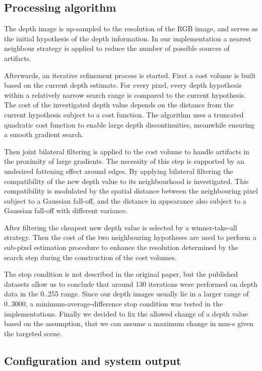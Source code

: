 \documentclass{ucl_thesis}
\begin{document}
\subsection{Processing algorithm}
\par The depth image is up-sampled to the resolution of the RGB image, and
serves as the initial hypothesis of the depth information. In our implementation a nearest neighbour strategy is applied to reduce the number of possible sources of artifacts. 
\par Afterwards, an iterative refinement process is started. First a cost volume is built based on the current depth estimate. For every pixel, every depth hypothesis within a relatively narrow search range is compared to the current hypothesis. The cost of the investigated depth value depends on the distance from the current hypothesis subject to a cost function. The algorithm uses a truncated quadratic cost function to enable large depth discontinuities, meanwhile ensuring a smooth gradient search.
\par Then joint bilateral filtering is applied to the cost volume to handle artifacts in the proximity of large gradients. The necessity of this step is supported by an undesired fattening effect around edges. By applying bilateral filtering the compatibility of the new depth value to its neighbourhood is investigated. This compatibility is modulated by the spatial distance between the neighbouring pixel subject to a Gaussian fall-off, and the distance in appearance also subject to a Gaussian fall-off with different variance.
\par After filtering the cheapest new depth value is selected by a winner-take-all strategy. Then the cost of the two neighbouring hypotheses are used to perform a sub-pixel estimation procedure to enhance the resolution determined by the search step during the construction of the cost volumes.

\par The stop condition is not described in the original paper, but the published datasets allow us to conclude that around 130 iterations were performed on depth data in the 0..255 range. Since our depth images usually lie in a larger range of 0..3000, a minimum-average-difference stop condition was tested in the implementations. Finally we decided to fix the allowed change of a depth value based on the assumption, that we can assume a maximum change in mm-s given the targeted scene.

\subsection{Configuration and system output}
\end{document}
